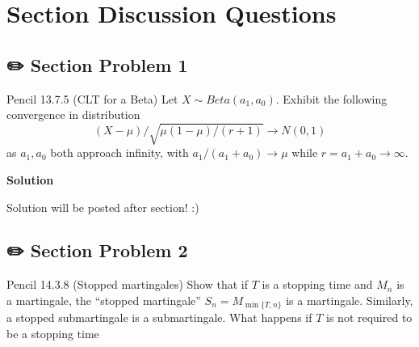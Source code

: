 \documentclass[
  letterpaper,
  DIV=11,
  numbers=noendperiod]{scrreprt}
\theoremstyle{definition}
\theoremstyle{plain}
\theoremstyle{remark}
\begin{document}
\hypertarget{section-discussion-questions-7}{%
\section*{Section Discussion
Questions}\label{section-discussion-questions-7}}


\hypertarget{section-problem-1-7}{%
\subsection*{✏️ Section Problem 1}\label{section-problem-1-7}}

Pencil 13.7.5 (CLT for a Beta) Let \(X\sim Beta(a_{1} ,a_{0})\). Exhibit
the following convergence in distribution \[
\begin{equation*}
(X-\mu )/\sqrt{\mu (1-\mu )/(r+1)}\rightarrow N(0,1)
\end{equation*}
\] as \(a_{1} ,a_{0}\) both approach infinity, with
\(a_{1} /(a_{1} +a_{0} )\rightarrow \mu\) while
\(r=a_{1} +a_{0}\rightarrow \infty\).

\begin{tcolorbox}[enhanced jigsaw, colback=white, leftrule=.75mm, breakable, toprule=.15mm, rightrule=.15mm, opacityback=0, left=2mm, bottomrule=.15mm, arc=.35mm, colframe=quarto-callout-tip-color-frame]
\begin{minipage}[t]{5.5mm}
\textcolor{quarto-callout-tip-color}{\faLightbulb}
\end{minipage}%
\begin{minipage}[t]{\textwidth - 5.5mm}

\textbf{Solution}\vspace{2mm}

Solution will be posted after section! :)

\end{minipage}%
\end{tcolorbox}

\hypertarget{section-problem-2-5}{%
\subsection*{✏️ Section Problem 2}\label{section-problem-2-5}}

Pencil 14.3.8 (Stopped martingales) Show that if \(T\) is a stopping
time and \(M_{n}\) is a martingale, the ``stopped martingale''
\(S_{n} =M_{\min \{T,n\}}\) is a martingale. Similarly, a stopped
submartingale is a submartingale. What happens if \(T\) is not required
to be a stopping time
\end{document}
